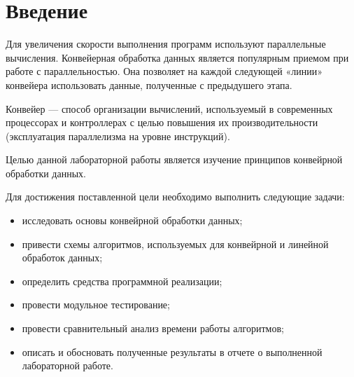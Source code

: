 \chapter*{Введение}

Для увеличения скорости выполнения программ используют параллельные вычисления. Конвейерная обработка данных является популярным приемом при работе с параллельностью. Она позволяет на каждой следующей «линии» конвейера использовать данные, полученные с предыдушего этапа. \cite{bib0}

Конвейер — способ организации вычислений, используемый в современных процессорах и контроллерах с целью повышения их производительности (эксплуатация параллелизма на уровне инструкций). \cite{bib1}

Целью данной лабораторной работы является изучение принципов конвейрной обработки данных.

Для достижения поставленной цели необходимо выполнить следующие задачи:

\begin{itemize}[label=---]
	\item исследовать основы конвейрной обработки данных;
	\item привести схемы алгоритмов, используемых для конвейрной и линейной обработок данных;
	\item определить средства программной реализации;
	\item провести модульное тестирование;
	\item провести сравнительный анализ времени работы алгоритмов;
	\item описать и обосновать полученные результаты в отчете о выполненной лабораторной работе.
\end{itemize}